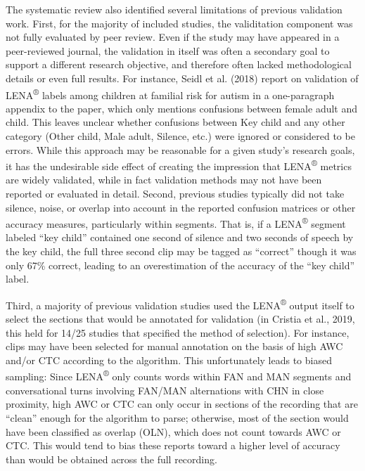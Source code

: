 \documentclass[english,table,man,floatsintext]{apa6}
\begin{document}
The systematic review also identified several limitations of previous validation work. First, for the majority of included studies, the validitation component was not fully evaluated by peer review. Even if the study may have appeared in a peer-reviewed journal, the validation in itself was often a secondary goal to support a different research objective, and therefore often lacked methodological details or even full results. For instance, Seidl et al. (2018) report on validation of LENA\textsuperscript{®} labels among children at familial risk for autism in a one-paragraph appendix to the paper, which only mentions confusions between female adult and child. This leaves unclear whether confusions between Key child and any other category (Other child, Male adult, Silence, etc.) were ignored or considered to be errors. While this approach may be reasonable for a given study's research goals, it has the undesirable side effect of creating the impression that LENA\textsuperscript{®} metrics are widely validated, while in fact validation methods may not have been reported or evaluated in detail.
Second, previous studies typically did not take silence, noise, or overlap into account in the reported confusion matrices or other accuracy measures, particularly within segments. That is, if a LENA\textsuperscript{®} segment labeled \enquote{key child} contained one second of silence and two seconds of speech by the key child, the full three second clip may be tagged as \enquote{correct} though it was only 67\% correct, leading to an overestimation of the accuracy of the \enquote{key child} label.

Third, a majority of previous validation studies used the LENA\textsuperscript{®} output itself to select the sections that would be annotated for validation (in Cristia et al., 2019, this held for 14/25 studies that specified the method of selection). For instance, clips may have been selected for manual annotation on the basis of high AWC and/or CTC according to the algorithm. This unfortunately leads to biased sampling: Since LENA\textsuperscript{®} only counts words within FAN and MAN segments and conversational turns involving FAN/MAN alternations with CHN in close proximity, high AWC or CTC can only occur in sections of the recording that are \enquote{clean} enough for the algorithm to parse; otherwise, most of the section would have been classified as overlap (OLN), which does not count towards AWC or CTC. This would tend to bias these reports toward a higher level of accuracy than would be obtained across the full recording.
\end{document}
